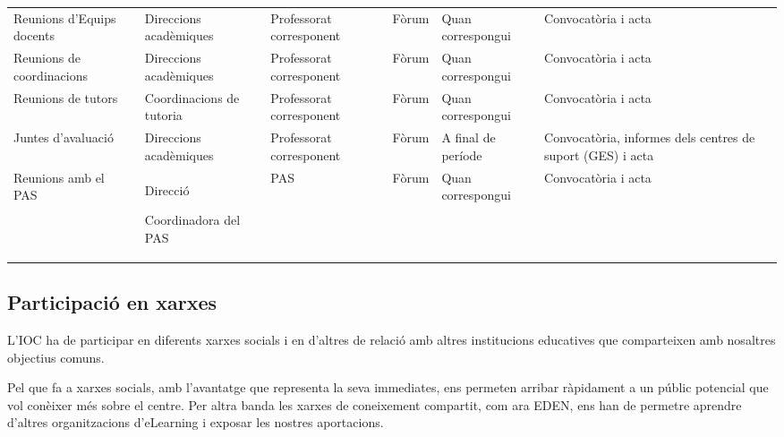 \documentclass[fontsize=10pt,%
paper=a4,%
DIV=14,%
twoside=semi,%
pagesize=auto,%
parskip=half,
captions=tableheading,%
numbers=noenddot,%
toc=graduated%
]{scrartcl}
\begin{document}
{\begin{longtable}{p{3cm}p{2cm}p{2cm}p{1.5cm}p{2cm}p{1.5cm}}
Reunions d'Equips docents                & Direccions acadèmiques   & Professorat corresponent                 & Fòrum          & Quan correspongui    & Convocatòria i acta                                        \\
Reunions de coordinacions                & Direccions acadèmiques   & Professorat corresponent                 & Fòrum          & Quan correspongui    & Convocatòria i acta                                        \\
Reunions de tutors                       & Coordinacions de tutoria & Professorat corresponent                 & Fòrum          & Quan correspongui    & Convocatòria i acta                                        \\
Juntes d'avaluació                       & Direccions acadèmiques   & Professorat corresponent                 & Fòrum          & A final de període   & Convocatòria, informes dels centres de suport (GES) i acta \\
Reunions amb el PAS                       & Direcció

Coordinadora del PAS & PAS                 & Fòrum          & Quan correspongui  & Convocatòria i acta \\
\end{longtable}
}%


\subsection{Participació en xarxes}

L'IOC ha de participar en diferents xarxes socials i en d'altres de relació amb altres institucions educatives que comparteixen amb nosaltres objectius comuns.

Pel que fa a xarxes socials, amb l'avantatge que representa la seva immediates, ens permeten arribar ràpidament a un públic potencial que vol conèixer més sobre el centre. Per altra banda les xarxes de coneixement compartit, com ara EDEN, ens han de permetre aprendre d'altres organitzacions d'eLearning i exposar les nostres aportacions.
\end{document}
